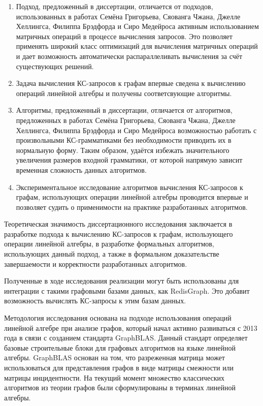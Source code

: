 {\novelty}
\begin{enumerate}[beginpenalty=10000] %
	
	\item Подход, предложенный в диссертации, отличается от подходов, использованных в работах Семёна Григорьева, Сяованга Чжана, Джелле Хеллингса, Филиппа Брэдфорда и Сиро Медейроса активным использованием матричных операций в процессе вычисления запросов. Это позволяет применять широкий класс оптимизаций для вычисления матричных операций и дает возможность автоматически распараллеливать вычисления за счёт существующих решений.
	
	\item Задача вычисления КС-запросов к графам впервые сведена к вычислению операций линейной алгебры и получены соответсвующие алгоритмы.
	
	\item Алгоритмы, предложенный в диссертации, отличается от алгоритмов, предложенных в работах Семёна Григорьева, Сяованга Чжана, Джелле Хеллингса, Филиппа Брэдфорда и Сиро Медейроса возможностью работать с произвольными КС-грамматиками без необходимости приводить их в нормальную форму. Таким образом, удаётся избежать значительного увеличения размеров входной грамматики, от которой напрямую зависит временная сложность данных алгоритмов.
	
	\item Экспериментальное исследование алгоритмов вычисления КС-запросов к графам, использующих операции линейной алгебры проводится впервые и позволяет судить о применимости на практике разработанных алгоритмов.
	
\end{enumerate}

{\influence} 
Теоретическая значимость диссертационного исследования заключается в разработке подхода к вычислению КС-запросов к графам, использующего операции линейной алгебры, в разработке формальных алгоритмов, использующих данный подход, а также в формальном доказательстве завершаемости и корректности разработанных алгоритмов.

Полученные в ходе исследования реализации могут быть использованы для интеграции с такими графовыми базами данных, как RedisGraph. Это добавит возможность вычислять КС-запросы к этим базам данных.

{\methods} Методология исследования основана на подходе использования операций линейной алгебре при анализе графов, который начал активно развиваться с 2013 года в связи с созданием стандарта GraphBLAS. Данный стандарт определяет базовые строительные блоки для графовых алгоритмов на языке линейной алгебры. GraphBLAS основан на том, что разреженная матрица может использоваться для представления графов в виде матрицы смежности или матрицы инцидентности. На текущий момент множество классических алгоритмов из теории графов были сформулированы в терминах линейной алгебры.

